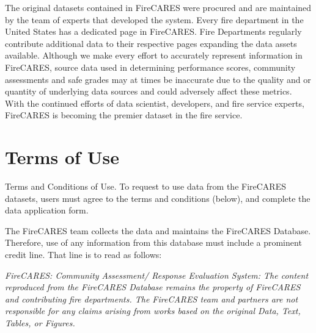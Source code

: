 \documentclass[12pt,oneside]{book}
\begin{document}
The original datasets contained in FireCARES were procured and are maintained by the team of experts that developed the system. Every fire department in the United States has a dedicated page in FireCARES. Fire Departments regularly contribute additional data to their respective pages expanding the data assets available. Although we make every effort to accurately represent information in FireCARES, source data used in determining performance scores, community assessments and safe grades may at times be inaccurate due to the quality and or quantity of underlying data sources and could adversely affect these metrics. With the continued efforts of data scientist, developers, and fire service experts,
FireCARES is becoming the premier dataset in the fire service. 

\chapter{Terms of Use}

Terms and Conditions of Use. To request to use data from the FireCARES datasets, users must agree to the terms and conditions (below), and complete the data application
form. 

The FireCARES team collects the data and maintains the FireCARES Database. Therefore, use of any information from this database must include a prominent credit line. That line is to
read as follows:

{\em FireCARES: Community Assessment/ Response Evaluation System: The content
reproduced from the FireCARES Database remains the property of FireCARES and
contributing fire departments. The FireCARES team and partners are not responsible for any
claims arising from works based on the original Data, Text, Tables, or Figures.}
\end{document}
